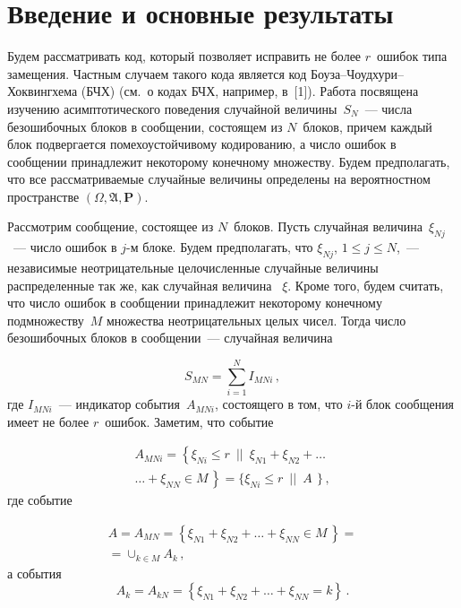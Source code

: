 \vspace{-1pt}


      \thispagestyle{headings}

      \begin{multicols}{2}

      \label{st\stat}

\section{Введение и основные результаты}

 Будем рассматривать код, который позволяет исправить не
более   $r$~ошибок типа замещения. Частным случаем такого кода
является код Боу\-за--Чоуд\-ху\-ри--Хок\-вин\-гхе\-ма (БЧХ) (см.\ о кодах БЧХ, например, в~[1]). Работа
посвящена изучению асимптотического поведения  случайной величины~$S_N$~--- 
числа безошибочных блоков  в сообщении, состоящем из $N$~блоков, 
причем каждый блок подвергается помехоустойчивому
кодированию, а число ошибок в сообщении принадлежит некоторому
конечному множеству. Будем предполагать, что все рассматриваемые
случайные величины определены на вероятностном пространстве
$(\Omega,
\mathfrak{A}, {\mathbf P})$.


 Рассмотрим  сообщение, состоящее из $N$~блоков. Пусть случайная величина~$\xi_{Nj}$~---
 число ошибок в $j$-м блоке. Будем предполагать, что  $\xi_{Nj}$, $1\le
j\le N$,~--- независимые неотрицательные целочисленные случайные
величины распределенные так же, как случайная величина~ $\xi$.   Кроме того,  будем считать,
 что число ошибок в сообщении  принадлежит некоторому конечному
 подмножеству~$M$ множества неотрицательных целых  чисел.
  Тогда число безошибочных блоков в  сообщении~--- случайная величина

\noindent
$$
S_{MN}=\sum_{i=1}^NI_{MNi}\,,
$$
где $I_{MNi}$~--- индикатор события~$A_{MNi}$, состоящего в том, что
$i$-й блок  сообщения имеет не более $r$~ошибок. Заметим, что
событие

\noindent
\begin{multline*}
A_{MNi}=\left \{\xi_{Ni}\le r\,\,\, \vert |\,\,\, \xi_{N1}+\xi_{N2}+ \dots {}\right.\\
\left.{}\dots +\xi_{NN}\in
M\, \right \}=\{\xi_{Ni}\le r\,\,\, \vert |\,\,\, A\,\ \}\,,
\end{multline*}
где событие

\noindent
\begin{multline*}
A= A_{MN}=\left\{\xi_{N1}+\xi_{N2}+ \dots +\xi_{NN}\in
M\, \right\}={}\\
{}=\cup_{k\in M}A_k\,,
\end{multline*}
а события
$$ A_{k}=A_{kN}=\left\{ \xi_{N1}+\xi_{N2}+ \dots +\xi_{NN}=k\right\}\,.
$$


\end{multicols}
